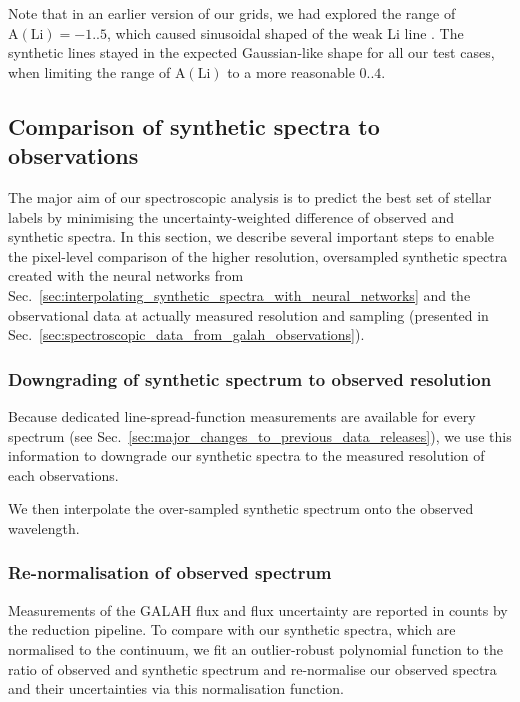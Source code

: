 \documentclass[
  journal=pasa,
  manuscript=research-paper, %
  year=2021,
  volume=37
]{cup-journal}
\begin{document}
Note that in an earlier version of our grids, we had explored the range of $\mathrm{A(Li)} = -1..5$, which caused sinusoidal shaped of the weak Li line \citep[see also][]{Wang2020}. The synthetic lines stayed in the expected Gaussian-like shape for all our test cases, when limiting the range of $\mathrm{A(Li)}$ to a more reasonable $0..4$.

\subsection{Comparison of synthetic spectra to observations}
\label{sec:comparison_synthetic_spectra_to_observations}

The major aim of our spectroscopic analysis is to predict the best set of stellar labels by minimising the uncertainty-weighted difference of observed and synthetic spectra. In this section, we describe several important steps to enable the pixel-level comparison of the higher resolution, oversampled synthetic spectra created with the neural networks from Sec.~\ref{sec:interpolating_synthetic_spectra_with_neural_networks} and the observational data at actually measured resolution and sampling (presented in Sec.~\ref{sec:spectroscopic_data_from_galah_observations}).

\subsubsection{Downgrading of synthetic spectrum to observed resolution}

Because dedicated line-spread-function measurements are available for every spectrum (see Sec.~\ref{sec:major_changes_to_previous_data_releases}), we use this information to downgrade our synthetic spectra to the measured resolution of each observations.

We then interpolate the over-sampled synthetic spectrum onto the observed wavelength.

\subsubsection{Re-normalisation of observed spectrum}

Measurements of the GALAH flux and flux uncertainty are reported in counts by the reduction pipeline. To compare with our synthetic spectra, which are normalised to the continuum, we fit an outlier-robust polynomial function to the ratio of observed and synthetic spectrum and re-normalise our observed spectra and their uncertainties via this normalisation function.
\end{document}
